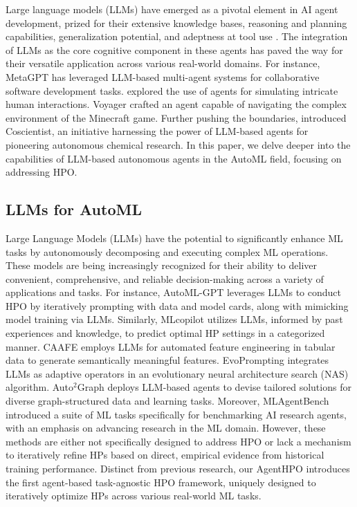 \documentclass{article}
\begin{document}
Large language models (LLMs) have emerged as a pivotal element in AI agent development, prized for their extensive knowledge bases, reasoning and planning capabilities, generalization potential, and adeptness at tool use \cite{openai2023gpt4, bubeck2023sparks}. The integration of LLMs as the core cognitive component in these agents has paved the way for their versatile application across various real-world domains. For instance, MetaGPT \cite{hong2023metagpt} has leveraged LLM-based multi-agent systems for collaborative software development tasks. \citet{park2023generative} explored the use of agents for simulating intricate human interactions. Voyager \cite{wang2023voyager} crafted an agent capable of navigating the complex environment of the Minecraft game. Further pushing the boundaries, \citet{boiko2023autonomous} introduced Coscientist, an initiative harnessing the power of LLM-based agents for pioneering autonomous chemical research. 
In this paper, we delve deeper into the capabilities of LLM-based autonomous agents in the AutoML field, focusing on addressing HPO.


\subsection{LLMs for AutoML}
Large Language Models (LLMs) have the potential to significantly enhance ML tasks by autonomously decomposing and executing complex ML operations. These models are being increasingly recognized for their ability to deliver convenient, comprehensive, and reliable decision-making across a variety of applications and tasks. For instance, AutoML-GPT \cite{zhang2023automl} leverages LLMs to conduct HPO by iteratively prompting with data and model cards, along with mimicking model training via LLMs. Similarly, MLcopilot \cite{zhang2023mlcopilot} utilizes LLMs, informed by past experiences and knowledge, to predict optimal HP settings in a categorized manner. CAAFE \cite{hollmann2023large} employs LLMs for automated feature engineering in tabular data to generate semantically meaningful features. EvoPrompting \cite{chen2023evoprompting} integrates LLMs as adaptive operators in an evolutionary neural architecture search (NAS) algorithm. Auto$^2$Graph \cite{wei2023unleashing} deploys LLM-based agents to devise tailored solutions for diverse graph-structured data and learning tasks. Moreover, MLAgentBench \cite{huang2023benchmarking} introduced a suite of ML tasks specifically for benchmarking AI research agents, with an emphasis on advancing research in the ML domain. However, these methods are either not specifically designed to address HPO or lack a mechanism to iteratively refine HPs based on direct, empirical evidence from historical training performance. Distinct from previous research, our AgentHPO introduces the first agent-based task-agnostic HPO framework, uniquely designed to iteratively optimize HPs across various real-world ML tasks.
\end{document}
